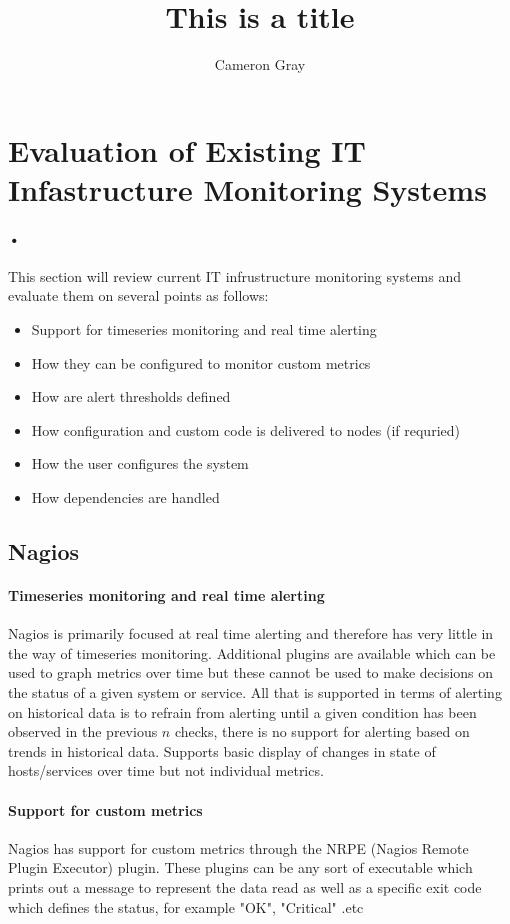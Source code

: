 \documentclass[10pt]{article}
\title{This is a title}
\author{Cameron Gray}
\begin{document}
	\maketitle

	\section{Evaluation of Existing IT Infastructure Monitoring Systems}
		\paragraph{•}
		This section will review current IT infrustructure monitoring systems and evaluate them on
		several points as follows:
		\begin{itemize}
			\item Support for timeseries monitoring and real time alerting
			\item How they can be configured to monitor custom metrics
			\item How are alert thresholds defined
			\item How configuration and custom code is delivered to nodes (if requried)
			\item How the user configures the system
			\item How dependencies are handled
		\end{itemize}
	
	\subsection{Nagios}
	\paragraph{Timeseries monitoring and real time alerting}
	Nagios is primarily focused at real time alerting and therefore has very little in the way of 
	timeseries monitoring.  Additional plugins are available which can be used to graph metrics
	over time but these cannot be used to make decisions on the status of a given system or service.
	All that is supported in terms of alerting on historical data is to refrain from alerting until
	a given condition has been observed in the previous $n$ checks, there is no support for alerting
	based on trends in historical data.  Supports basic display of changes in state of hosts/services
	over time but not individual metrics.
	
	\paragraph{Support for custom metrics}
	Nagios has support for custom metrics through the NRPE (Nagios Remote Plugin Executor) plugin.
	These plugins can be any sort of executable which prints out a message to represent the data read
	as well as a specific exit code which defines the status, for example "OK", "Critical"
	.etc
	
\end{document}
